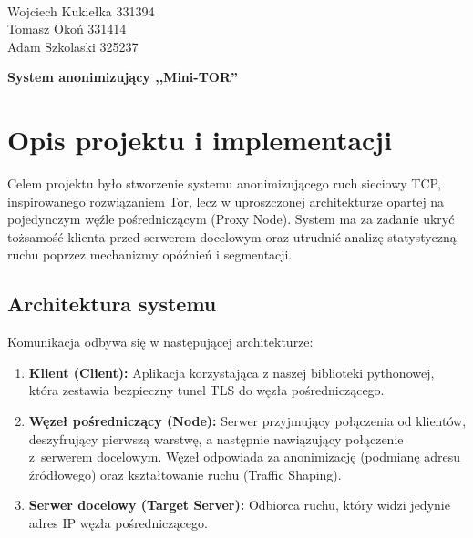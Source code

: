 \documentclass[12pt, a4paper]{article}
\begin{document}
\pagestyle{myheadings}

\\

\vspace{-0.5em}
\noindent Wojciech Kukiełka 331394\\
Tomasz Okoń 331414\\
Adam Szkolaski 325237

\hrulefill

\begin{center}
    \LARGE \textbf{System anonimizujący ,,Mini-TOR''}
\end{center}

\tableofcontents
\newpage

\section{Opis projektu i implementacji}

Celem projektu było stworzenie systemu anonimizującego ruch sieciowy TCP, inspirowanego rozwiązaniem Tor, lecz w uproszczonej architekturze opartej na pojedynczym węźle pośredniczącym (Proxy Node). System ma za zadanie ukryć tożsamość klienta przed serwerem docelowym oraz utrudnić analizę statystyczną ruchu poprzez mechanizmy opóźnień i segmentacji.

\subsection{Architektura systemu}
Komunikacja odbywa się w następującej architekturze:
\begin{enumerate}
    \item \textbf{Klient (Client):} Aplikacja korzystająca z naszej biblioteki pythonowej, która zestawia bezpieczny tunel TLS do węzła pośredniczącego.
    \item \textbf{Węzeł pośredniczący (Node):} Serwer przyjmujący połączenia od klientów, deszyfrujący pierwszą warstwę, a następnie nawiązujący połączenie z~serwerem docelowym. Węzeł odpowiada za anonimizację (podmianę adresu źródłowego) oraz kształtowanie ruchu (Traffic Shaping).
    \item \textbf{Serwer docelowy (Target Server):} Odbiorca ruchu, który widzi jedynie adres IP węzła pośredniczącego.
\end{enumerate}
\end{document}
